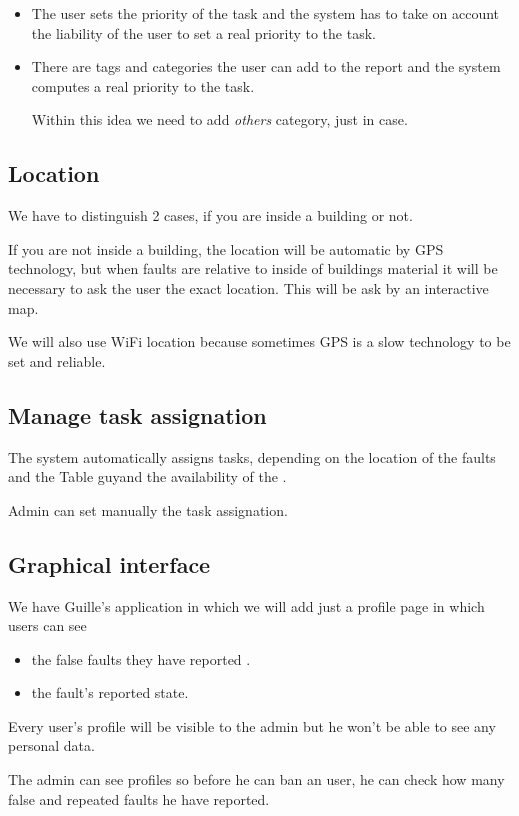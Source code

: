 \documentclass[nobuilddate,nochap]{apuntes}
\newcommand{\tbg}{Table guy}
\newcommand{\tbg}{Table guys}
\begin{document}
\begin{itemize}
\item The user sets the priority of the task and the system has to take on account the liability of the user to set a real priority to the task. 

\item There are tags and categories the user can add to the report and the system computes a real priority to the task. 

Within this idea we need to add \textit{others} category, just in case.
\end{itemize}

\subsection{Location}

We have to distinguish 2 cases, if you are inside a building or not.

If you are not inside a building, the location will be automatic by GPS technology, but when faults are relative to inside of buildings material it will be necessary to ask the user the exact location. This will be ask by an interactive map. 


We will also use WiFi location because sometimes GPS is a slow technology to be set and reliable.

\subsection{Manage task assignation}
The system automatically assigns tasks, depending on the location of the faults and the \tbg and the availability of the \tbgs.

Admin can set manually the task assignation.

\subsection{Graphical interface}
We have Guille's application in which we will add just a profile page in which users can see 
\begin{itemize}
\item the false faults they have reported .
\item the fault's reported state.
\end{itemize}

Every user's profile will be visible to the admin but he won't be able to see any personal data. 

The admin can see profiles so before he can ban an user, he can check how many false and repeated faults he have reported.
\end{document}
